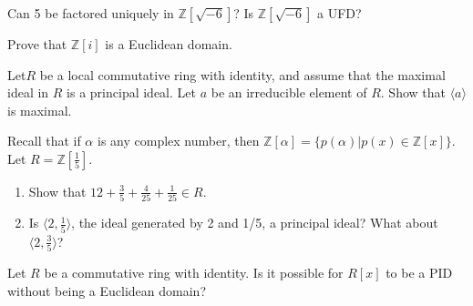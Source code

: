 \documentclass[12pt,letterpaper,boxed]{hmcpset}
\begin{document}

\begin{problem}[18.3.9]
Can 5 be factored uniquely in $\mathbb{Z}[\sqrt{-6}]$? Is $\mathbb{Z}[\sqrt{-6}]$ a UFD?
\end{problem}

\begin{solution}
\end{solution}

\clearpage

\begin{problem}[18.4.7]
Prove that $\mathbb{Z}[i]$ is a Euclidean domain.
\end{problem}

\begin{solution}
\end{solution}

\clearpage

\begin{problem}[18.6.2]
Let$R$ be a local commutative ring with identity, and assume that the maximal ideal in $R$ is a principal ideal. Let $a$ be an irreducible element of $R$. Show that $\langle a \rangle$ is maximal.
\end{problem}

\begin{solution}
\end{solution}

\clearpage

\begin{problem}[19.1.3]
Recall that if $\alpha$ is any complex number, then $\mathbb{Z}[\alpha] = \{p(\alpha) \vert p(x) \in \mathbb{Z}[x] \}$. Let $R = \mathbb{Z}[\frac{1}{5}]$.
\begin{enumerate}[label=\alph*]
\item Show that $12 + \frac{3}{5} + \frac{4}{25} + \frac {1}{25} \in R$.
\item Is $\langle 2,\frac{1}{5} \rangle$, the ideal generated by 2 and 1/5, a principal ideal?  What about $\langle 2, \frac{3}{5} \rangle$?
\end{enumerate}
\end{problem}

\begin{solution}
\end{solution}

\clearpage

\begin{problem}[19.2.7]
Let $R$ be a commutative ring with identity. Is it possible for $R[x]$ to be a PID without being a Euclidean domain?
\end{problem}

\begin{solution}
\end{solution}
\end{document}
